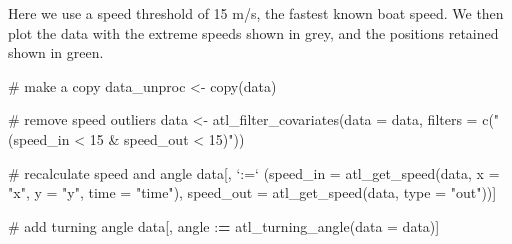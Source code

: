 \documentclass[]{scrreprt}
\newenvironment{Shaded}{}{}
\newcommand{\CommentTok}[1]{\textcolor[rgb]{0.00,0.50,0.00}{#1}}
\newcommand{\DataTypeTok}[1]{#1}
\newcommand{\ErrorTok}[1]{\textcolor[rgb]{1.00,0.00,0.00}{\textbf{#1}}}
\newcommand{\KeywordTok}[1]{\textcolor[rgb]{0.00,0.00,1.00}{#1}}
\newcommand{\NormalTok}[1]{#1}
\newcommand{\OperatorTok}[1]{#1}
\newcommand{\StringTok}[1]{\textcolor[rgb]{0.00,0.50,0.50}{#1}}
\begin{document}
Here we use a speed threshold of 15 m/s, the fastest known boat speed.
We then plot the data with the extreme speeds shown in grey, and the positions retained shown in green.

\begin{Shaded}
\begin{Highlighting}[]
\CommentTok{# make a copy}
\NormalTok{data_unproc <-}\StringTok{ }\KeywordTok{copy}\NormalTok{(data)}

\CommentTok{# remove speed outliers}
\NormalTok{data <-}\StringTok{ }\KeywordTok{atl_filter_covariates}\NormalTok{(}\DataTypeTok{data =}\NormalTok{ data,}
            \DataTypeTok{filters =} \KeywordTok{c}\NormalTok{(}\StringTok{"(speed_in < 15 & speed_out < 15)"}\NormalTok{))}

\CommentTok{# recalculate speed and angle}
\NormalTok{data[, }\StringTok{`}\DataTypeTok{:=}\StringTok{`}\NormalTok{ (}\DataTypeTok{speed_in =} \KeywordTok{atl_get_speed}\NormalTok{(data, }
                                      \DataTypeTok{x =} \StringTok{"x"}\NormalTok{, }
                                      \DataTypeTok{y =} \StringTok{"y"}\NormalTok{, }
                                      \DataTypeTok{time =} \StringTok{"time"}\NormalTok{),}
             \DataTypeTok{speed_out =} \KeywordTok{atl_get_speed}\NormalTok{(data, }\DataTypeTok{type =} \StringTok{"out"}\NormalTok{))]}

\CommentTok{# add turning angle}
\NormalTok{data[, angle }\OperatorTok{:}\ErrorTok{=}\StringTok{ }\KeywordTok{atl_turning_angle}\NormalTok{(}\DataTypeTok{data =}\NormalTok{ data)]}
\end{Highlighting}
\end{Shaded}
\end{document}
